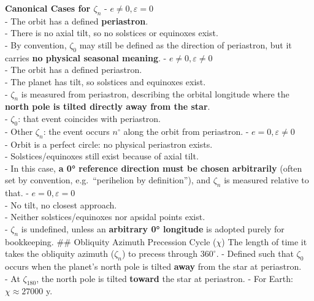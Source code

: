 \documentclass[
  letterpaper,
]{book}
\begin{document}
\textbf{Canonical Cases for \(\zeta_n\)\hspace{0pt}} -
\(e \neq 0, \varepsilon = 0\)\\
- The orbit has a defined \textbf{periastron}.\\
- There is no axial tilt, so no solstices or equinoxes exist.\\
- By convention, \(\zeta_0\)\hspace{0pt} may still be defined as the
direction of periastron, but it carries \textbf{no physical seasonal
meaning}. - \(e \neq 0, \varepsilon \neq 0\)\\
- The orbit has a defined periastron.\\
- The planet has tilt, so solstices and equinoxes exist.\\
- \(\zeta_n\)\hspace{0pt} is measured from periastron, describing the
orbital longitude where the \textbf{north pole is tilted directly away
from the star}.\\
- \(\zeta_0\)\hspace{0pt}: that event coincides with periastron.\\
- Other \(\zeta_n\)\hspace{0pt}: the event occurs \(n^\circ\) along the
orbit from periastron. - \(e=0, \varepsilon \neq 0\)\\
- Orbit is a perfect circle: no physical periastron exists.\\
- Solstices/equinoxes still exist because of axial tilt.\\
- In this case, \textbf{a 0° reference direction must be chosen
arbitrarily} (often set by convention, e.g.~``perihelion by
definition''), and \(\zeta_n\)\hspace{0pt} is measured relative to that.
- \(e=0, \varepsilon = 0\)\\
- No tilt, no closest approach.\\
- Neither solstices/equinoxes nor apsidal points exist.\\
- \(\zeta_n\)\hspace{0pt} is undefined, unless an \textbf{arbitrary 0°
longitude} is adopted purely for bookkeeping. \#\# Obliquity Azimuth
Precession Cycle (\(\chi\)) The length of time it takes the obliquity
azimuth (\(\zeta_{n}\)) to precess through \(360^\circ\). - Defined such
that \(\zeta_{0}\) occurs when the planet's north pole is tilted
\textbf{away} from the star at periastron.\\
- At \(\zeta_{180}\), the north pole is tilted \textbf{toward} the star
at periastron. - For Earth: \(\chi ≈ 27000\) y.
\end{document}
